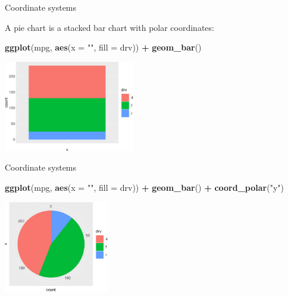 \documentclass[ignorenonframetext,]{beamer}
\newenvironment{Shaded}{\begin{snugshade}}{\end{snugshade}}
\newcommand{\DataTypeTok}[1]{\textcolor[rgb]{0.13,0.29,0.53}{#1}}
\newcommand{\KeywordTok}[1]{\textcolor[rgb]{0.13,0.29,0.53}{\textbf{#1}}}
\newcommand{\NormalTok}[1]{#1}
\newcommand{\OperatorTok}[1]{\textcolor[rgb]{0.81,0.36,0.00}{\textbf{#1}}}
\newcommand{\StringTok}[1]{\textcolor[rgb]{0.31,0.60,0.02}{#1}}
\begin{document}
\begin{frame}[fragile]{Coordinate systems}
\protect\hypertarget{coordinate-systems-1}{}

A pie chart is a stacked bar chart with polar coordinates:

\begin{Shaded}
\begin{Highlighting}[]
\KeywordTok{ggplot}\NormalTok{(mpg, }\KeywordTok{aes}\NormalTok{(}\DataTypeTok{x =} \StringTok{""}\NormalTok{, }\DataTypeTok{fill =}\NormalTok{ drv)) }\OperatorTok{+}
\StringTok{  }\KeywordTok{geom_bar}\NormalTok{() }
\end{Highlighting}
\end{Shaded}

\begin{center}\includegraphics[height=150px]{data-visualization_files/figure-beamer/unnamed-chunk-139-1} \end{center}

\end{frame}

\begin{frame}[fragile]{Coordinate systems}
\protect\hypertarget{coordinate-systems-2}{}

\begin{Shaded}
\begin{Highlighting}[]
\KeywordTok{ggplot}\NormalTok{(mpg, }\KeywordTok{aes}\NormalTok{(}\DataTypeTok{x =} \StringTok{""}\NormalTok{, }\DataTypeTok{fill =}\NormalTok{ drv)) }\OperatorTok{+}
\StringTok{  }\KeywordTok{geom_bar}\NormalTok{() }\OperatorTok{+}
\StringTok{  }\KeywordTok{coord_polar}\NormalTok{(}\StringTok{"y"}\NormalTok{)}
\end{Highlighting}
\end{Shaded}

\begin{center}\includegraphics[height=150px]{data-visualization_files/figure-beamer/unnamed-chunk-140-1} \end{center}

\end{frame}
\end{document}
